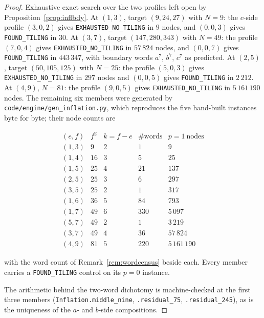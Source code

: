 \documentclass[11pt,reqno]{amsart}
\theoremstyle{plain}
\theoremstyle{definition}
\begin{document}
\begin{proof}
Exhaustive exact search over the two profiles left open by Proposition~\ref{prop:inflbdy}. At $(1,3)$,
target $(9,24,27)$ with $N=9$: the $c$-side profile $(3,0,2)$ gives \texttt{EXHAUSTED\_NO\_TILING} in
$9$ nodes, and $(0,0,3)$ gives \texttt{FOUND\_TILING} in $30$. At $(3,7)$, target $(147,280,343)$ with
$N=49$: the profile $(7,0,4)$ gives \texttt{EXHAUSTED\_NO\_TILING} in $57\,824$ nodes, and $(0,0,7)$
gives \texttt{FOUND\_TILING} in $443\,347$, with boundary words $a^7$, $b^7$, $c^7$ as predicted. At
$(2,5)$, target $(50,105,125)$ with $N=25$: the profile $(5,0,3)$ gives \texttt{EXHAUSTED\_NO\_TILING}
in $297$ nodes and $(0,0,5)$ gives \texttt{FOUND\_TILING} in $2\,212$. At $(4,9)$, $N=81$: the
profile $(9,0,5)$ gives \texttt{EXHAUSTED\_NO\_TILING} in $5\,161\,190$ nodes. The remaining six
members were generated by \texttt{code/engine/gen\_inflation.py}, which reproduces the five hand-built
instances byte for byte; their node counts are

\[
\begin{array}{lrrrr}
(e,f) & f^2 & k=f-e & \#\text{words} & p=1\ \text{nodes}\\\hline
(1,3) & 9 & 2 & 1 & 9\\
(1,4) & 16 & 3 & 5 & 25\\
(1,5) & 25 & 4 & 21 & 137\\
(2,5) & 25 & 3 & 6 & 297\\
(3,5) & 25 & 2 & 1 & 317\\
(1,6) & 36 & 5 & 84 & 793\\
(1,7) & 49 & 6 & 330 & 5\,097\\
(5,7) & 49 & 2 & 1 & 3\,219\\
(3,7) & 49 & 4 & 36 & 57\,824\\
(4,9) & 81 & 5 & 220 & 5\,161\,190
\end{array}
\]

with the word count of Remark~\ref{rem:wordcensus} beside each. Every member carries a
\texttt{FOUND\_TILING} control on its $p=0$ instance.

The arithmetic behind the two-word dichotomy is machine-checked at the first three members
(\texttt{Inflation.middle\_nine}, \texttt{.residual\_75}, \texttt{.residual\_245}), as is the
uniqueness of the $a$- and $b$-side compositions.


\end{proof}
\end{document}
